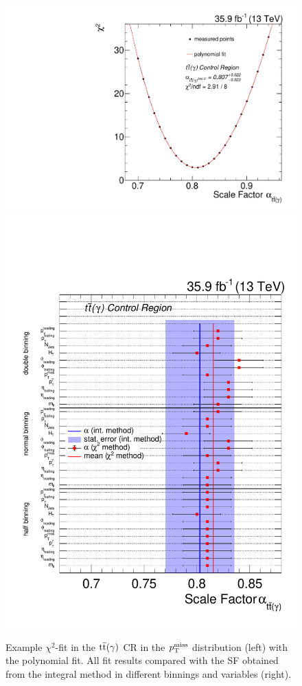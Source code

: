 \begin{figure}[tbp]
 \centering
 \includegraphics[width=\pairwidth]{figures/plots_CR/chi/TT_met}
 \includegraphics[width=\pairwidth]{figures/plots_CR/chi/TT_Compare}
 \caption{Example $\chi^2$-fit in the ${\mathrm{t}\overline{\mathrm{t}}}(\gamma)$ CR in the $p_{\mathrm{T}}^\text{miss}$ distribution (left) with the polynomial fit. All fit results compared with the SF obtained from the integral method in different binnings and variables (right).}
 \label{fig:chiTT}
\end{figure}

